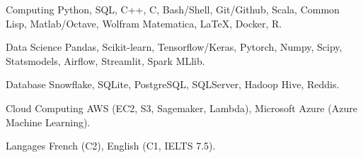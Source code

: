 

\begin{cvskills}

  \cvskill
    {Computing} %
    {Python, SQL, C++, C, Bash/Shell, Git/Github, Scala, Common Lisp, Matlab/Octave, Wolfram Matematica, \LaTeX, Docker, R.} %

  \cvskill
    {Data Science} %
    {Pandas, Scikit-learn, Tensorflow/Keras, Pytorch, Numpy, Scipy, Statsmodels, Airflow, Streamlit, Spark MLlib.} %

  \cvskill
    {Database} %
    {Snowflake, SQLite, PostgreSQL, SQLServer, Hadoop Hive, Reddis.} %

  \cvskill
    {Cloud Computing} %
    {AWS (EC2, S3, Sagemaker, Lambda), Microsoft Azure (Azure Machine Learning).} %

  \cvskill
    {Langages} %
    {French (C2), English (C1, IELTS 7.5).} %

\end{cvskills}
